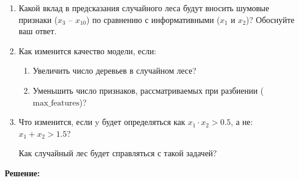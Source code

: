 \begin{enumerate}
\item  Какой вклад в предсказания случайного леса будут вносить шумовые признаки 
($x_3$ – $x_{10}$) по сравнению с информативными ($x_1$ и $x_2$)? Обоснуйте ваш ответ.

\item Как изменится качество модели, если:
\begin{enumerate}
    \item Увеличить число деревьев в случайном лесе?
    \item Уменьшить число признаков, рассматриваемых при разбиении (\(\text{max\_features}\))?
\end{enumerate}

\item Что изменится, если y будет определяться как
$x_1 \cdot x_2 > 0.5$,
а не:
$x_1 + x_2 > 1.5$?

Как случайный лес будет справляться с такой задачей?

\end{enumerate}

\textbf{Решение:}


